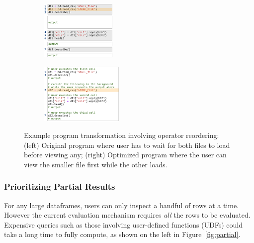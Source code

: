\begin{figure}[h!]
    \centering
    \begin{subfigure}%
         \centering
         \includegraphics[width=0.4\textwidth]{submissions/interactivity/figures/reorderOrig.pdf}
    \end{subfigure}
    \hspace{10pt}
    \begin{subfigure}%
         \centering
         \includegraphics[width=0.44\textwidth]{submissions/interactivity/figures/reorderOpt.pdf}
    \end{subfigure}
    \caption{Example program transformation involving operator reordering: (left) Original program where user has to wait for both files to load before viewing any; (right) Optimized program where the user can view the smaller file first while the other loads.}
    \label{fig:files}
\end{figure}

\subsubsection{Prioritizing Partial Results}
For any large dataframes, users can only inspect a handful of rows at a time.  However the current evaluation mechanism requires \emph{all} the rows to be evaluated.  Expensive queries such as those involving user-defined functions (UDFs) could take a long time to fully compute, as shown on the left in Figure~\ref{fig:partial}.

